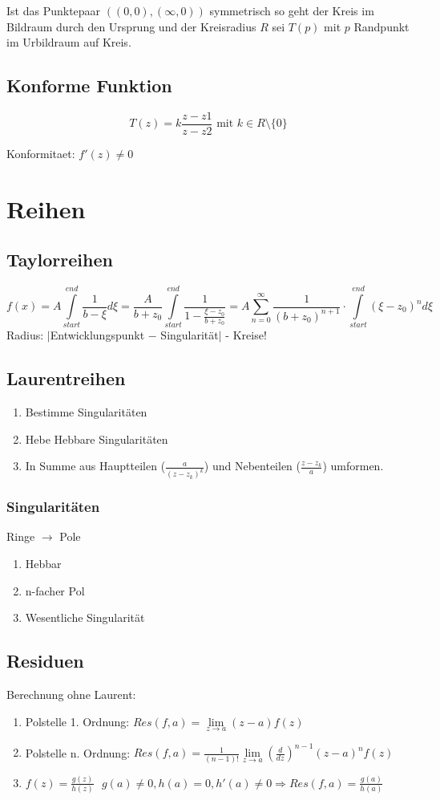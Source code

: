 \documentclass[10pt,a4paper]{article}
\begin{document}
Ist das Punktepaar $((0,0), (\infty, 0))$ symmetrisch so geht der Kreis im Bildraum durch den Ursprung und der Kreisradius $R$ sei $T(p)$ mit $p$ Randpunkt im Urbildraum auf Kreis.

\subsection{Konforme Funktion}
\[T(z) = k \frac{z-z1}{z-z2} \mbox{ mit } k \in R\setminus \lbrace 0 \rbrace\]

Konformitaet: $f'(z) \neq 0$

\section{Reihen}
\subsection{Taylorreihen}
\[
f(x) = A \int\limits_{start}^{end} \frac{1}{b - \xi} d\xi = \frac{A}{b+z_0} \int\limits_{start}^{end} \frac{1}{1- \frac{\xi - z_0}{b+z_0}} = A \sum\limits_{n=0}^\infty \frac{1}{(b+z_0)^{n+1}} \cdot \int\limits_{start}^{end} (\xi-z_0)^n d\xi
\]
Radius: $|$Entwicklungspunkt $ - $ Singularität$|$ - Kreise!

\subsection{Laurentreihen}
\begin{enumerate}
\item Bestimme Singularitäten
\item Hebe Hebbare Singularitäten
\item In Summe aus Hauptteilen ($ \frac{a}{(z-z_k)^k}$) und Nebenteilen ($ \frac{z-z_k}{a}$) umformen.
\end{enumerate}

\subsubsection{Singularitäten}
Ringe $\rightarrow$ Pole
\begin{enumerate}
 \item Hebbar
 \item n-facher Pol
 \item Wesentliche Singularität
\end{enumerate}

\subsection{Residuen}
Berechnung ohne Laurent:
\begin{enumerate}
\item Polstelle 1. Ordnung: $Res(f,a) = \lim\limits_{z\rightarrow a} (z-a)f(z)$
\item Polstelle n. Ordnung: $Res(f,a) = \frac{1}{(n-1)!} \lim\limits_{z\rightarrow a} \left(\frac{d}{dz}\right)^{n-1} (z-a)^n f(z)$
\item $f(z)=\frac{g(z)}{h(z)} \,\,\,\, g(a) \neq 0, h(a) = 0, h'(a)\neq 0 \Rightarrow Res(f,a)=\frac{g(a)}{h(a)}$
\end{enumerate}
\end{document}
